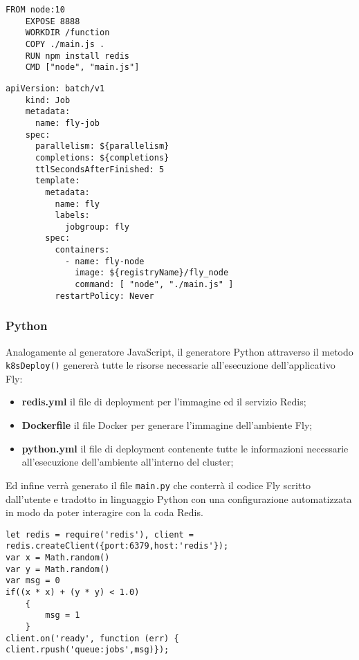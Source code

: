 \begin{lstlisting}[language=FLY,caption={Dockerfile}, label={lst:k8s}]
    FROM node:10
    EXPOSE 8888
    WORKDIR /function
    COPY ./main.js .
    RUN npm install redis
    CMD ["node", "main.js"]
\end{lstlisting}

\begin{lstlisting}[language=FLY,caption={File di Deployment}, label={lst:k8s}]
    apiVersion: batch/v1
    kind: Job
    metadata:
      name: fly-job
    spec:
      parallelism: ${parallelism}
      completions: ${completions}
      ttlSecondsAfterFinished: 5
      template:
        metadata:
          name: fly
          labels:
            jobgroup: fly
        spec:
          containers:
            - name: fly-node
              image: ${registryName}/fly_node
              command: [ "node", "./main.js" ]
          restartPolicy: Never
\end{lstlisting}

\subsubsection{Python}
Analogamente al generatore JavaScript, il generatore Python attraverso il metodo \verb|k8sDeploy()| genererà tutte le risorse necessarie all'esecuzione dell'applicativo Fly:

\begin{itemize}
  \item\textbf{redis.yml} il file di deployment per l'immagine ed il servizio Redis;
  \item\textbf{Dockerfile} il file Docker per generare l'immagine dell'ambiente Fly;
  \item\textbf{python.yml} il file di deployment contenente tutte le informazioni necessarie all'esecuzione dell'ambiente all'interno del cluster;
\end{itemize}

Ed infine verrà generato il file \verb|main.py| che conterrà il codice Fly scritto dall'utente e tradotto in linguaggio Python con una configurazione automatizzata in modo da poter interagire con la coda Redis.

\begin{lstlisting}[language=FLY,caption={Python generato da un file di esempio della stima di PI Greco usando il metodo Monte Carlo}, label={lst:k8s}]
    let redis = require('redis'), client = redis.createClient({port:6379,host:'redis'});
var x = Math.random()
var y = Math.random()
var msg = 0
if((x * x) + (y * y) < 1.0)
    {
        msg = 1 
    }
client.on('ready', function (err) {
client.rpush('queue:jobs',msg)});
\end{lstlisting}


